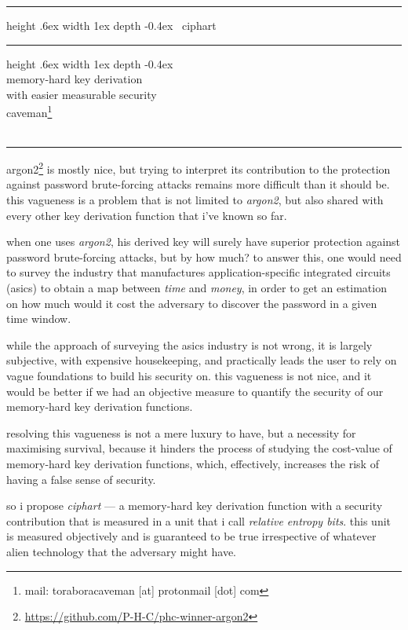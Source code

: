 \documentclass[twocolumn]{article}
\makeatletter
\def\myrulefill{%
    \leavevmode\leaders\hrule%
    height .6ex width 1ex depth -0.4ex%
    \hfill\kern\z@%
}
\makeatother
\begin{document}
\SetInd{.15em}{1em}

\begin{center}
\Huge
\myrulefill\ ciphart \myrulefill\\
\LARGE
memory-hard key derivation \\
with easier measurable security\\
\normalsize
caveman\footnote{mail: toraboracaveman [at] protonmail [dot] com}\\
\footnotesize
\DTMnow\\
\rule{1\columnwidth}{2pt}
\end{center}

argon2\footnote{\url{https://github.com/P-H-C/phc-winner-argon2}} is mostly
nice, but trying to interpret its contribution to the protection against
password brute-forcing attacks remains more difficult than it should be.
this vagueness is a problem that is not limited to \emph{argon2}, but also
shared with every other key derivation function that i've known so far.

when one uses \emph{argon2}, his derived key will surely have superior
protection against password brute-forcing attacks, but by how much?  to
answer this, one would need to survey the industry that manufactures
application-specific integrated circuits (asics) to obtain a map between
\emph{time} and \emph{money}, in order to get an estimation on how much
would it cost the adversary to discover the password in a given time
window.

while the approach of surveying the asics industry is not wrong, it is
largely subjective, with expensive housekeeping, and practically leads the
user to rely on vague foundations to build his security on.  this vagueness
is not nice, and it would be better if we had an objective measure to
quantify the security of our memory-hard key derivation functions.

resolving this vagueness is not a mere luxury to have, but a necessity for
maximising survival, because it hinders the process of studying the
cost-value of memory-hard key derivation functions, which, effectively,
increases the risk of having a false sense of security.

so i propose \emph{ciphart} --- a memory-hard key derivation function with
a security contribution that is measured in a unit that i call
\emph{relative entropy bits}.  this unit is measured objectively and is
guaranteed to be true irrespective of whatever alien technology that the
adversary might have.
\end{document}
